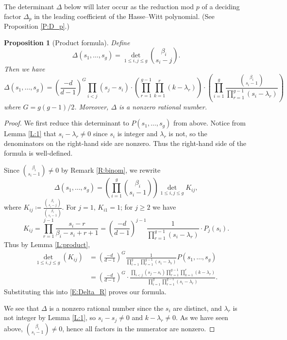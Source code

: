 \documentclass{amsart}
\theoremstyle{plain}
\newtheorem{proposition}[theorem]{Proposition}
\theoremstyle{remark}
\theoremstyle{remark}
\newcommand{\0}{\mathbf{0}}
\newcommand{\1}{\mathbf{1}}
\begin{document}
The determinant $\Delta$ below 
will later occur as the reduction mod $p$
of a deciding factor $\Delta_p$
in the leading coefficient of the Hasse--Witt polynomial.
(See Proposition \ref{P:D_p}.)

\begin{proposition}[Product formula]
\label{P:delta}
Define
\begin{equation*}\label{E:Delta}
\Delta(s_1,\ldots,s_g)
=
\det_{1\le i,j\le g}
\binom{\beta_i}{s_i-j}.
\end{equation*}
Then we have  
\[\boxed{
\Delta(s_1,\ldots,s_g)
=
\left(\frac{-d}{d-1}\right)^G
\displaystyle \prod_{i<j}(s_j-s_i)\cdot
\displaystyle 
\left(\prod_{r=1}^{g-1}
\prod_{k=1}^r(k-\lambda_r)\right)
\cdot
\left(\prod_{i=1}^g\frac{ \binom{\beta_i}{s_i-1}}
 { \prod_{r=1}^{g-1}(s_i-\lambda_r)}\right)
}
\]
where $G=g(g-1)/2$.
Moreover, $\Delta$ is a nonzero rational number.
\end{proposition}

\begin{proof}
We first reduce this determinant to $P(s_1,\ldots,s_g)$ from above.
Notice from Lemma \ref{L:1} that $s_i-\lambda_r\ne 0$ since $s_i$ is integer and 
$\lambda_r$ is not, so the denominators on the right-hand side are nonzero.
Thus the right-hand side of the formula is well-defined.

Since $\binom{\beta_i}{s_i-1}\ne 0$ by Remark \ref{R:binom},
we rewrite 
\begin{equation}\label{E:Delta_R}
\Delta(s_1,\ldots,s_g)
=
\left(\prod_{i=1}^g \binom{\beta_i}{s_i-1}\right)
\det_{1\le i,j\le g} K_{ij},
\end{equation}
where 
$
K_{ij}
\coloneqq
\frac{\binom{\beta_i}{s_i-j}}{\binom{\beta_i}{s_i-1}}.
$
For $j=1$, $K_{i1}=1$; for $j\ge 2$ 
we have 
$$
K_{ij}
=
\prod_{r=1}^{j-1}
\frac{s_i-r}{\beta_i-s_i+r+1}=\left(\frac{-d}{d-1}\right)^{j-1}\frac{1}{\prod_{r=1}^{g-1}(s_i-\lambda_r)}
\cdot P_j(s_i).
$$
Thus by Lemma \ref{L:product},
\begin{align*}
\det_{1\le i,j\le g}(K_{ij})
&=
\left(\frac{-d}{d-1}\right)^G \frac{1}{\prod_{i=1}^{g}
\prod_{r=1}^{g-1}(s_i-\lambda_r)}
P(s_1,\dots,s_g)\\
&=
\left(\frac{-d}{d-1}\right)^G \cdot
\frac{
\prod_{i<j}(s_j-s_i)
 \prod_{r=1}^{g-1}\prod_{k=1}^r(k-\lambda_r)
}{
\prod_{i=1}^g\prod_{r=1}^{g-1}(s_i-\lambda_r)
}.
\end{align*}
Substituting this into \eqref{E:Delta_R} proves our formula. 

We see that $\Delta$ is a nonzero rational number 
since the $s_i$ are distinct, and $\lambda_r$ 
is not integer by Lemma \ref{L:1}, so  $s_i-s_j\ne 0$ and $k-\lambda_r\ne 0$.
As we have seen above, $\binom{\beta_i}{s_i-1}\ne 0$,
hence all factors in the numerator are nonzero. 
\end{proof}
\end{document}

